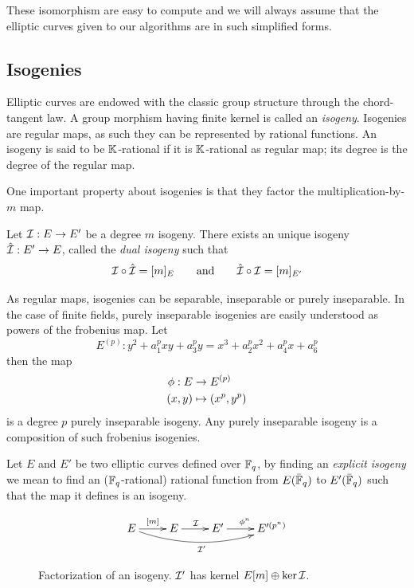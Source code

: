 These isomorphism are easy to compute and we will always assume that
the elliptic curves given to our algorithms are in such simplified
forms.

\subsection{Isogenies}
\label{sec:isogenies}

Elliptic curves are endowed with the classic group structure through
the chord-tangent law. A group morphism having finite kernel is called
an \emph{isogeny}. Isogenies are regular maps, as such they can be
represented by rational functions. An isogeny is said to be
$\mathbb{K}$-rational if it is $\mathbb{K}$-rational as regular map; its degree is the
degree of the regular map.

One important property about isogenies is that they factor the
multiplication-by-$m$ map.

\begin{definition}
  Let $\mathcal{I} : E \rightarrow E'$ be a degree $m$ isogeny. There exists an
  unique isogeny $\hat{\mathcal{I}} : E' \rightarrow E$, called the \emph{dual
    isogeny} such that
  \[\mathcal{I}\circ\hat{\mathcal{I}} = [m]_E \qquad\text{and}\qquad \hat{\mathcal{I}}\circ\mathcal{I} =
  [m]_{E'}\]
\end{definition}

As regular maps, isogenies can be separable, inseparable or purely
inseparable. In the case of finite fields, purely inseparable
isogenies are easily understood as powers of the frobenius map. Let
\[E^{(p)} : y^2 + a_1^pxy + a_3^py = x^3 + a_2^px^2 + a_4^px + a_6^p\]
then the map
\begin{align*}
  \phi : E &\rightarrow E^{(p)}\\
          (x,y) &\mapsto (x^p,y^p)
\end{align*}
is a degree $p$ purely inseparable isogeny. Any purely inseparable
isogeny is a composition of such frobenius isogenies.

Let $E$ and $E'$ be two elliptic curves defined over $\mathbb{F}_q$, by
finding an \emph{explicit isogeny} we mean to find an
($\mathbb{F}_q$-rational) rational function from $E(\bar{\mathbb{F}}_q)$ to
$E'(\bar{\mathbb{F}}_q)$ such that the map it defines is an isogeny.

\begin{figure}
  \centering
  \[\xymatrix{
    E \ar[r]^{[m]}\ar@/_1pc/[rrr]_{\I'} & E \ar[r]^\I & E' \ar[r]^{\frobisog^n} & E'^{(p^n)}\\
  }\]
  \label{fig:fact}
  \caption{Factorization of an isogeny. $\mathcal{I}'$ has kernel $E[m]\oplus\ker\mathcal{I}$.}
\end{figure}

